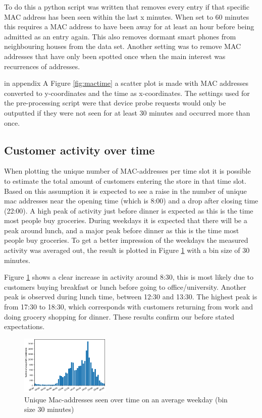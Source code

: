 \documentclass[conference,compsoc]{IEEEtran}
\begin{document}
To do this a python script was written that removes every entry if that specific MAC address has been seen within the last x minutes. When set to 60 minutes this requires a MAC address to have been away for at least an hour before being admitted as an entry again. This also removes dormant smart phones from neighbouring houses from the data set. Another setting was to remove MAC addresses that have only been spotted once when the main interest was recurrences of addresses.

in appendix A Figure \ref{fig:mactime} a scatter plot is made with MAC addresses converted to y-coordinates and the time as x-coordinates. The settings used for the pre-processing script were that device probe requests would only be outputted if they were not seen for at least 30 minutes and occurred more than once. 

\subsection{Customer activity over time}
When plotting the unique number of MAC-addresses per time slot it is possible to estimate the total amount of customers entering the store in that time slot. Based on this assumption it is expected to see a raise in the number of unique mac addresses near the opening time (which is 8:00) and a drop after closing time (22:00). A high peak of activity just before dinner is expected as this is the time most people buy groceries. During weekdays it is expected that there will be a peak around lunch, and a major peak before dinner as this is the time most people buy groceries. To get a better impression of the weekdays the measured activity was averaged out, the result is plotted in Figure \ref{fig:WeekdayHist} with a bin size of 30 minutes. 


Figure \ref{fig:WeekdayHist} shows a clear increase in activity around 8:30, this is most likely due to customers buying breakfast or lunch before going to office/university. Another peak is observed during lunch time, between 12:30 and 13:30. The highest peak is from 17:30 to 18:30, which corresponds with customers returning from work and doing grocery shopping for dinner. These results confirm our before stated expectations.

\begin{figure}[h!]
    \centering
    \includegraphics[width=0.38\textwidth]{img/daySum.png} 
    \caption{Unique Mac-addresses seen over time on an average weekday (bin size 30 minutes)}
    \label{fig:WeekdayHist}
\end{figure}
\end{document}
